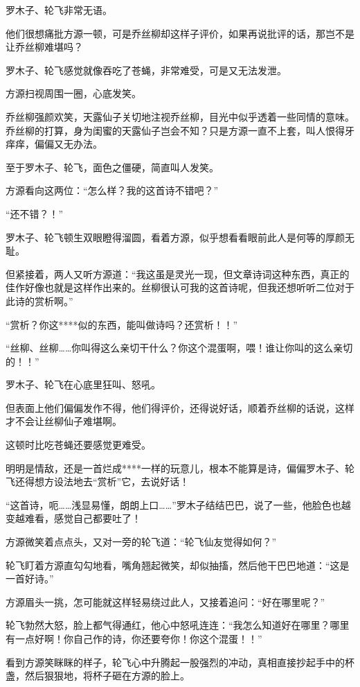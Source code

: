 
\begin{this_body}

罗木子、轮飞非常无语。

他们很想痛批方源一顿，可是乔丝柳却这样子评价，如果再说批评的话，那岂不是让乔丝柳难堪吗？

罗木子、轮飞感觉就像吞吃了苍蝇，非常难受，可是又无法发泄。

方源扫视周围一圈，心底发笑。

乔丝柳强颜欢笑，天露仙子关切地注视乔丝柳，目光中似乎透着一些同情的意味。乔丝柳的打算，身为闺蜜的天露仙子岂会不知？只是方源一直不上套，叫人恨得牙痒痒，偏偏又无办法。

至于罗木子、轮飞，面色之僵硬，简直叫人发笑。

方源看向这两位：“怎么样？我的这首诗不错吧？”

“还不错？！”

罗木子、轮飞顿生双眼瞪得溜圆，看着方源，似乎想看看眼前此人是何等的厚颜无耻。

但紧接着，两人又听方源道：“我这虽是灵光一现，但文章诗词这种东西，真正的佳作好像也就是这样作出来的。丝柳很认可我的这首诗呢，但我还想听听二位对于此诗的赏析啊。”

“赏析？你这****似的东西，能叫做诗吗？还赏析！！”

“丝柳、丝柳……你叫得这么亲切干什么？你这个混蛋啊，喂！谁让你叫的这么亲切的！！”

罗木子、轮飞在心底里狂叫、怒吼。

但表面上他们偏偏发作不得，他们得评价，还得说好话，顺着乔丝柳的话说，这样才不会让丝柳仙子难堪啊。

这顿时比吃苍蝇还要感觉更难受。

明明是情敌，还是一首烂成****一样的玩意儿，根本不能算是诗，偏偏罗木子、轮飞还得想方设法地去“赏析”它，去说好话！

“这首诗，呃……浅显易懂，朗朗上口……”罗木子结结巴巴，说了一些，他脸色也越变越难看，感觉自己都要吐了！

方源微笑着点点头，又对一旁的轮飞道：“轮飞仙友觉得如何？”

轮飞盯着方源直勾勾地看，嘴角翘起微笑，却似抽搐，然后他干巴巴地道：“这是一首好诗。”

方源眉头一挑，怎可能就这样轻易绕过此人，又接着追问：“好在哪里呢？”

轮飞勃然大怒，脸上都气得通红，他心中怒吼连连：“我怎么知道好在哪里？哪里有一点好啊！你自己作的诗，你还要夸你！你这个混蛋！！”

看到方源笑眯眯的样子，轮飞心中升腾起一股强烈的冲动，真相直接抄起手中的杯盏，然后狠狠地，将杯子砸在方源的脸上。


\end{this_body}

